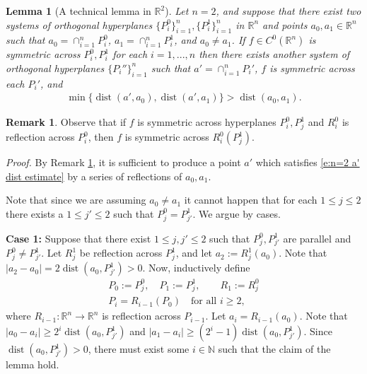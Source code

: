 \documentclass[12pt]{amsart}
\numberwithin{equation}{section}
\theoremstyle{plain}
\newtheorem{lemma}[theorem]{Lemma}
\theoremstyle{definition}
\newtheorem{remark}[theorem]{Remark}
\newcommand{\dist}{\mathop\mathrm{dist}\nolimits}
\begin{document}
\begin{lemma}[A technical lemma in $\mathbb{R}^2$]\label{l:reflection arg n=2}
Let $n=2$, and suppose that there exist two systems of orthogonal hyperplanes $\{P_i^0\}_{i=1}^n, \{P_i^1 \}_{i=1}^n$ in $\mathbb{R}^n$ and points $a_0, a_1 \in \mathbb{R}^n$ such that $a_0 = \cap_{i=1}^n P^0_i$, $a_1 = \cap_{i=1}^n P_i^1$, and $a_0 \not = a_1$.  If $f \in C^0(\mathbb{R}^n)$ is symmetric across $P_i^0, P_i^1$ for each $i=1,..., n$ then there exists another system of orthogonal hyperplanes $\{P_i''\}_{i=1}^n$ such that $a' = \cap_{i=1}^nP_i'$, $f$ is symmetric across each $P_i'$, and 
\begin{align}\label{e:n=2 a' dist estimate}
\min\{\dist(a', a_0), \dist(a', a_1)\} > \dist(a_0, a_1).
\end{align}
\end{lemma}

\begin{remark}\label{r:reflections of reflections} Observe that if $f$ is symmetric across hyperplanes $P_i^0, P_j^1$ and $R_{i}^0$ is reflection across $P_i^0$, then $f$ is symmetric across $R_i^0(P_j^1)$.
\end{remark}

\textit{Proof.}
By Remark \ref{r:reflections of reflections}, it is sufficient to produce a point $a'$ which satisfies \eqref{e:n=2 a' dist estimate} by a series of reflections of $a_0, a_1$. 

Note that since we are assuming $a_0 \not=a_1$ it cannot happen that for each $1\le j \le 2$ there exists a $1\le j'\le 2$ such that $P_j^0 = P_{j'}^1$. We argue by cases.

\textbf{Case 1:} Suppose that there exist $1 \le j, j' \le 2$ such that $P_{j}^0, P_{j'}^1$ are parallel and $P_j^0 \not = P_{j'}^1$.  Let $R_j^1$ be reflection across $P_{j}^1$, and let $a_2:= R_{j}^1(a_0)$. Note that $|a_2 - a_0| = 2\dist(a_0, P_{j'}^1)>0$.  Now, inductively define 
\begin{align*}
    P_0:= P_j^0, \quad P_1:= P_j^1, \qquad R_1:= R_j^0\\
    P_i = R_{i-1}(P_0) \quad \text{for all } i \ge 2,
\end{align*}
where $R_{i-1}:\mathbb{R}^n \rightarrow \mathbb{R}^n$ is reflection across $P_{i-1}$. Let $a_i = R_{i-1}(a_0)$.  Note that $|a_0 - a_i| \ge 2^i \dist(a_0, P^1_{j'})$ and $|a_1 - a_i| \ge (2^i-1) \dist(a_0, P^1_{j'})$.  Since $\dist(a_0, P^1_{j'})>0$, there must exist some $i \in \mathbb{N}$ such that the claim of the lemma hold.
\end{document}
